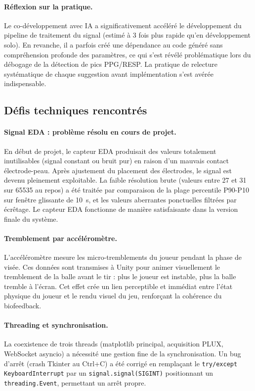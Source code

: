 \documentclass[runningheads]{llncs}
\begin{document}
\paragraph{Réflexion sur la pratique.}
Le co-développement avec IA a significativement accéléré le développement
du pipeline de traitement du signal (estimé à 3 fois plus rapide qu'en
développement solo). En revanche, il a parfois créé une dépendance au
code généré sans compréhension profonde des paramètres, ce qui s'est
révélé problématique lors du débogage de la détection de pics PPG/RESP.
La pratique de relecture systématique de chaque suggestion avant
implémentation s'est avérée indispensable.

\subsection{Défis techniques rencontrés}

\paragraph{Signal EDA : problème résolu en cours de projet.}
En début de projet, le capteur EDA produisait des valeurs totalement inutilisables
(signal constant ou bruit pur) en raison d'un mauvais contact électrode-peau. Après
ajustement du placement des électrodes, le signal est devenu pleinement exploitable.
La faible résolution brute (valeurs entre 27 et 31 sur 65535 au repos) a été traitée
par comparaison de la plage percentile P90-P10 sur fenêtre glissante de 10~s, et les
valeurs aberrantes ponctuelles filtrées par écrêtage. Le capteur EDA fonctionne
de manière satisfaisante dans la version finale du système.

\paragraph{Tremblement par accéléromètre.}
L'accéléromètre mesure les micro-tremblements du joueur pendant la phase de visée.
Ces données sont transmises à Unity pour animer visuellement le tremblement de
la balle avant le tir : plus le joueur est instable, plus la balle tremble à
l'écran. Cet effet crée un lien perceptible et immédiat entre l'état physique
du joueur et le rendu visuel du jeu, renforçant la cohérence du biofeedback.

\paragraph{Threading et synchronisation.}
La coexistence de trois threads (matplotlib principal, acquisition PLUX,
WebSocket asyncio) a nécessité une gestion fine de la synchronisation.
Un bug d'arrêt (crash Tkinter au Ctrl+C) a été corrigé en remplaçant
le \texttt{try/except KeyboardInterrupt} par un \texttt{signal.signal(SIGINT)}
positionnant un \texttt{threading.Event}, permettant un arrêt propre.
\end{document}
